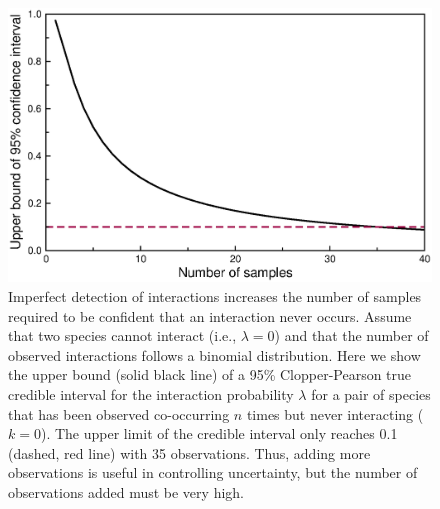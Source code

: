 \documentclass[12pt]{article}
\begin{document}
  \begin{figure}[h!]
    \caption{Imperfect detection of interactions increases the number of samples required to be confident that an interaction never occurs. Assume that two species cannot interact (i.e., $\lambda=0$) and that the number of observed interactions follows a binomial distribution. Here we show the upper bound (solid black line) of a 95\% Clopper-Pearson true credible interval for the interaction probability $\lambda$ for a pair of species that has been observed co-occurring $n$ times but never interacting ($k = 0$). The upper limit of the credible interval only reaches 0.1 (dashed, red line) with 35 observations. Thus, adding more observations is useful in controlling uncertainty, but the number of observations added must be very high. }
    \label{upper_limits}
    \begin{center}
    \includegraphics*[width=.8\textwidth]{figures/upper_limit_DG.eps}
    \end{center}
    \end{figure}
\end{document}
